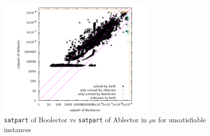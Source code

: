 \begin{figure}[]
    \centering
        \includegraphics[width=0.7\textwidth]{plots/unsat/Boolector-vs-Ablector-satpart.png}
    \caption{\texttt{satpart} of Boolector vs \texttt{satpart} of Ablector in $\mu$s for unsatisfiable instances}
    \label{fig:evaluation:unsat:scatter}
\end{figure}

